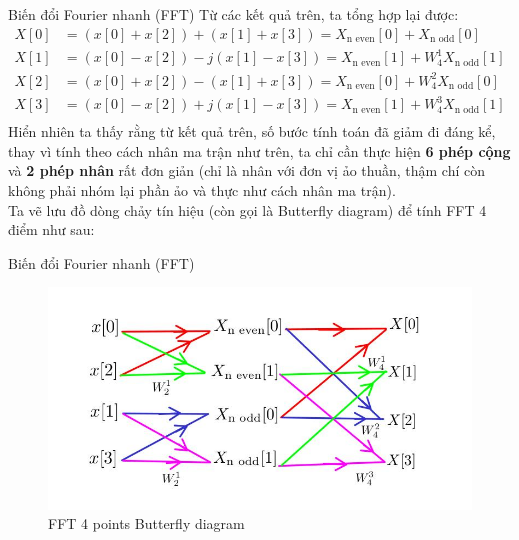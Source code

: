 \documentclass[8pt]{beamer}
\begin{document}
\begin{frame}{Biến đổi Fourier nhanh (FFT)}
Từ các kết quả trên, ta tổng hợp lại được:
\begin{equation*}
\begin{split}
	X[0]&=(x[0]+x[2])+(x[1]+x[3])=X_{\text{n even}}[0]+X_{\text{n odd}}[0]\\
	X[1]&=(x[0]-x[2])-j(x[1]-x[3])=X_{\text{n even}}[1]+W_{4}^{1}X_{\text{n odd}}[1]\\
	X[2]&=(x[0]+x[2])-(x[1]+x[3])=X_{\text{n even}}[0]+W_{4}^{2}X_{\text{n odd}}[0]\\
X[3]&=(x[0]-x[2])+j(x[1]-x[3])=X_{\text{n even}}[1]+W_{4}^{3}X_{\text{n odd}}[1]\\
\end{split}
\end{equation*}
Hiển nhiên ta thấy rằng từ kết quả trên, số bước tính toán đã giảm đi đáng kể, thay vì tính theo cách nhân ma trận như trên, ta chỉ cần thực hiện \textbf{6 phép cộng} và \textbf{2 phép nhân} rất đơn giản (chỉ là nhân với đơn vị ảo thuần, thậm chí còn không phải nhóm lại phần ảo và thực như cách nhân ma trận).
\\ Ta vẽ lưu đồ dòng chảy tín hiệu (còn gọi là Butterfly diagram) để tính FFT 4 điểm như sau:
\end{frame}
\begin{frame}{Biến đổi Fourier nhanh (FFT)}
\begin{figure}[h]
			\includegraphics[width=1.1\textwidth]{7.jpg}

			\caption{FFT 4 points Butterfly diagram}			\label{fig:re7}

		\end{figure}
\end{frame}
\end{document}
